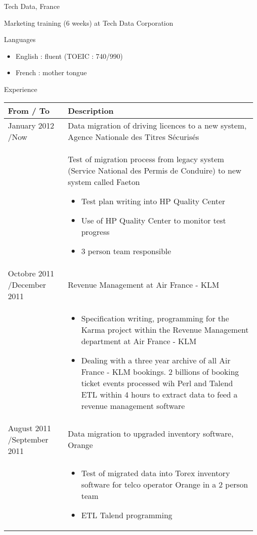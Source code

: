 \documentclass[a4paper,11pt]{letter}
\begin{document}
Tech Data, France
	

Marketing training (6 weeks) at Tech Data Corporation

Languages
\begin{itemize}
\item    English : fluent (TOEIC : 740/990)
\item    French : mother tongue
\end{itemize}

Experience

\begin{tabular}{|p{}|p{}|}
\hline
From / To & Description \\
\hline
January 2012 \slash Now & Data migration of driving licences to a new system, Agence Nationale des Titres Sécuris\'es \\
\hline
	

 & Test of migration process from legacy system (Service National des Permis de Conduire) to new system called Faeton 
\begin{itemize}
\item Test plan writing into HP Quality Center
\item Use of HP Quality Center to monitor test progress
\item 3 person team responsible
\end{itemize} \\
\hline
	

Octobre 2011 \slash December 2011 & Revenue Management at Air France - KLM \\
\hline
	

     & 
\begin{itemize}
\item Specification writing, programming for the Karma project within the Revenue Management department at Air France - KLM

\item Dealing with a three year archive of all Air France - KLM bookings. 2 billions of booking ticket events processed wih Perl and Talend ETL within 4 hours to extract data to feed a revenue management software
\end{itemize} \\
\hline
	

August 2011 \slash September 2011 & Data migration to upgraded inventory software, Orange \\
\hline
& \begin{itemize}
\item Test of migrated data into Torex inventory software for telco operator Orange in a 2 person team
\item ETL Talend programming
\end{itemize} \\
\hline


\end{tabular}
\end{document}
